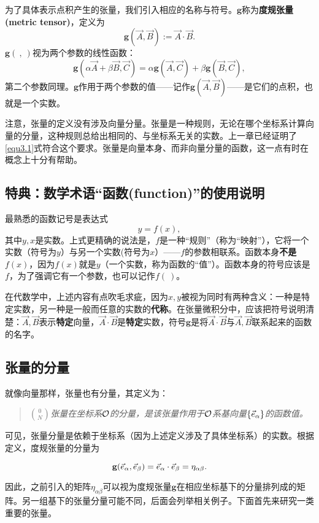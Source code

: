 为了具体表示点积产生的张量，我们引入相应的名称与符号。$\mathbf{g}$称为\textbf{度规张量  (metric tensor)}，定义为
\begin{equation}
    \mathbf{g} (\vec{A}, \vec{B}) := \vec{A} \cdot \vec{B}.
\label{equ3.3}
\end{equation}
$\mathbf{g} (\ , \ )$视为两个参数的线性函数：
\begin{equation}
    \mathbf{g} (\alpha \vec{A} + \beta \vec{B}, \vec{C}) = \alpha \mathbf{g} (\vec{A}, \vec{C}) + \beta \mathbf{g} (\vec{B}, \vec{C}),
\label{equ3.4}
\end{equation}
第二个参数同理。$\mathbf{g}$作用于两个参数的值——记作$\mathbf{g} (\vec{A}, \vec{B})$——是它们的点积，也就是一个实数。

注意，张量的定义没有涉及向量分量。张量是一种规则，无论在哪个坐标系计算向量的分量，这种规则总给出相同的、与坐标系无关的实数。上一章已经证明了\eqref{equ3.1}式符合这个要求。张量是向量本身、而非向量分量的函数，这一点有时在概念上十分有帮助。

\subsection*{特典：数学术语“函数(function)”的使用说明}
最熟悉的函数记号是表达式
\[
    y = f(x),
\]
其中$y, x$是实数。上式更精确的说法是，$f$是一种“规则”（称为“映射”），它将一个实数（符号为$y$）与另一个实数(符号为$x$）——$f$的参数相联系。函数本身\textbf{不是}$f(x)$，因为$f(x)$就是$y$（一个实数，称为函数的“值”）。函数本身的符号应该是$f$，为了强调它有一个参数，也可以记作$f (\ )$。

在代数学中，上述内容有点吹毛求疵，因为$x, y$被视为同时有两种含义：一种是特定实数，另一种是一般而任意的实数的\textbf{代称}。在张量微积分中，应该把符号说明清楚：$\vec{A}, \vec{B}$表示\textbf{特定}向量，$\vec{A} \cdot \vec{B}$是\textbf{特定}实数，符号$\mathbf{g}$是将$\vec{A} \cdot \vec{B}$与$\vec{A}, \vec{B}$联系起来的函数的名字。

\subsection*{张量的分量}
就像向量那样，张量也有分量，其定义为：
\begin{quote}
    \textit{$\binom{0}{N}$张量在坐标系$\mathcal{O}$的分量，是该张量作用于$\mathcal{O}$系基向量$\{ \vec{e}_\alpha \}$的函数值。}
\end{quote}
可见，张量分量是依赖于坐标系（因为上述定义涉及了具体坐标系）的实数。根据定义，度规张量的分量为
\begin{shaded}
\begin{equation}
    \mathbf{g} (\vec{e}_\alpha, \vec{e}_\beta) = \vec{e}_\alpha \cdot \vec{e}_\beta = \eta_{\alpha \beta}.
\label{equ3.5}
\end{equation}
\end{shaded}
因此，之前引入的矩阵$\eta_{\alpha \beta}$可以视为度规张量$\mathbf{g}$在相应坐标基下的分量排列成的矩阵。另一组基下的张量分量可能不同，后面会列举相关例子。下面首先来研究一类重要的张量。


